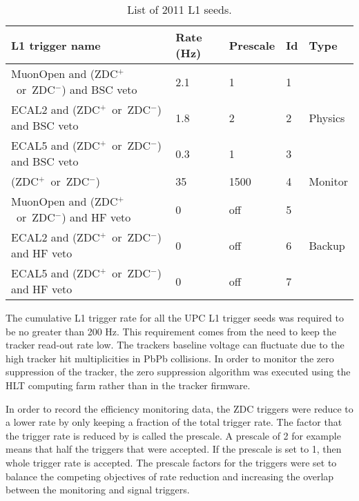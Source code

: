     \begin{table}[h]
      \centering
      \begin{tabular}{|l|l|l|l|l|}
        \hline L1 trigger name & Rate (Hz) & Prescale & Id & Type \\ \hline \hline
        MuonOpen and (ZDC$^{+}$~or~ZDC$^{-}$) and BSC veto & 2.1 & 1 & 1 & \multirow{3}{*}{Physics} \\  \hhline{----~}
        ECAL2 and (ZDC$^{+}$~or~ZDC$^{-}$) and BSC veto & 1.8 & 2 & 2 & \\  \hhline{----~}
        ECAL5 and (ZDC$^{+}$~or~ZDC$^{-}$) and BSC veto & 0.3 & 1 & 3 & \\  \hline
        (ZDC$^{+}$~or~ZDC$^{-}$) & 35 & 1500 & 4 & Monitor \\  \hline
        MuonOpen and (ZDC$^{+}$~or~ZDC$^{-}$) and HF veto & 0 & off & 5 & \multirow{3}{*}{Backup} \\ \hhline{----~}
        ECAL2 and (ZDC$^{+}$~or~ZDC$^{-}$) and HF veto & 0 & off & 6 & \\  \hhline{----~}
        ECAL5 and (ZDC$^{+}$~or~ZDC$^{-}$) and HF veto & 0 & off & 7 & \\  \hline
      \end{tabular}
      \caption{List of 2011 L1 seeds.}
      \label{tab:l1Triggers2011}
    \end{table}
    The cumulative L1 trigger rate for all the UPC L1 trigger seeds was
      required to be no greater than 200 Hz.
    This requirement comes from the need to keep the tracker read-out rate
      low. 
    The trackers baseline voltage can fluctuate due to the high tracker hit 
      multiplicities in PbPb collisions.
    In order to monitor the zero suppression of the tracker, the zero 
      suppression algorithm was executed using the HLT computing farm 
	      rather than in the tracker firmware.

    In order to record the efficiency monitoring data, the ZDC triggers were
      reduce to a lower rate by only keeping a fraction of the total trigger 
      rate. 
    The factor that the trigger rate is reduced by is called the prescale.
    A prescale of 2 for example means that half the triggers that were 
      accepted.
    If the prescale is set to 1, then whole trigger rate is accepted. 
    The prescale factors for the triggers were set to balance the competing objectives 
      of rate reduction and increasing the overlap between the monitoring and
      signal triggers.

